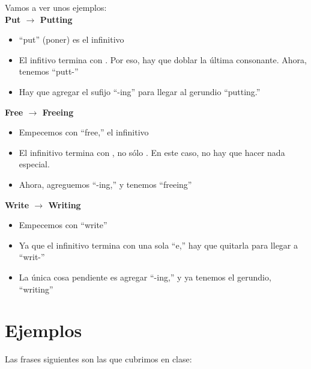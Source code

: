 Vamos a ver unos ejemplos:\\

\textbf{Put $\rightarrow$ Putting}\\
\begin{itemize}[noitemsep]
	\item ``put'' (poner) es el infinitivo
	\item El infitivo termina con . Por eso, hay que doblar la última consonante. Ahora, tenemos ``putt-''
	\item Hay que agregar el sufijo ``-ing'' para llegar al gerundio ``putting.''
\end{itemize}

\textbf{Free $\rightarrow$ Freeing}
\begin{itemize}[noitemsep]
	\item Empecemos con ``free,'' el infinitivo
	\item El infinitivo termina con , no sólo . En este caso, no hay que hacer nada especial.
	\item Ahora, agreguemos ``-ing,'' y tenemos ``freeing''
\end{itemize}

\textbf{Write $\rightarrow$ Writing}
\begin{itemize}[noitemsep]
	\item Empecemos con ``write''
	\item Ya que el infinitivo termina con una sola ``e,'' hay que quitarla para llegar a ``writ-''
	\item La única cosa pendiente es agregar ``-ing,'' y ya tenemos el gerundio, ``writing''
\end{itemize}

\section{Ejemplos}
Las frases siguientes son las que cubrimos en clase:

